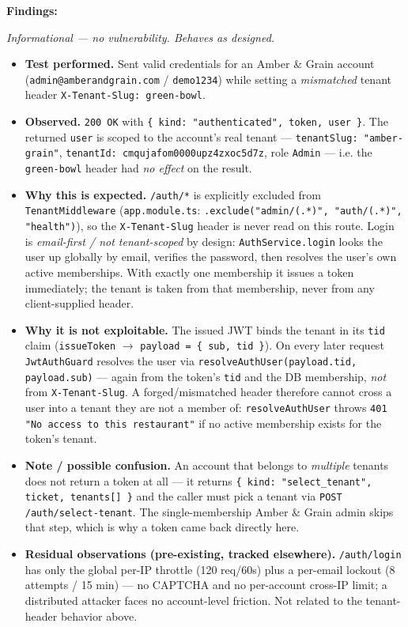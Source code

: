 \documentclass[11pt,a4paper]{article}
\newcommand{\code}[1]{\colorbox{codebg}{\texttt{\small #1}}}
\begin{document}
\textbf{Findings:}

\textit{\textcolor{muted}{Informational — no vulnerability. Behaves as designed.}}

\begin{itemize}[leftmargin=1.4em,itemsep=2pt,topsep=2pt]
  \item \textbf{Test performed.} Sent valid credentials for an Amber \& Grain
        account (\code{admin@amberandgrain.com} / \code{demo1234}) while setting a
        \emph{mismatched} tenant header \code{X-Tenant-Slug: green-bowl}.
  \item \textbf{Observed.} \code{200 OK} with
        \code{\{ kind: "authenticated", token, user \}}. The returned \code{user}
        is scoped to the account's real tenant — \code{tenantSlug: "amber-grain"},
        \code{tenantId: cmqujafom0000upz4zxoc5d7z}, role \code{Admin} — i.e. the
        \code{green-bowl} header had \emph{no effect} on the result.
  \item \textbf{Why this is expected.} \code{/auth/*} is explicitly excluded from
        \code{TenantMiddleware} (\code{app.module.ts}:
        \code{.exclude("admin/(.*)", "auth/(.*)", "health")}), so the
        \code{X-Tenant-Slug} header is never read on this route. Login is
        \emph{email-first / not tenant-scoped} by design: \code{AuthService.login}
        looks the user up globally by email, verifies the password, then resolves
        the user's own active memberships. With exactly one membership it issues a
        token immediately; the tenant is taken from that membership, never from any
        client-supplied header.
  \item \textbf{Why it is not exploitable.} The issued JWT binds the tenant in its
        \code{tid} claim (\code{issueToken} $\to$ \code{payload = \{ sub, tid \}}).
        On every later request \code{JwtAuthGuard} resolves the user via
        \code{resolveAuthUser(payload.tid, payload.sub)} — again from the token's
        \code{tid} and the DB membership, \emph{not} from \code{X-Tenant-Slug}. A
        forged/mismatched header therefore cannot cross a user into a tenant they
        are not a member of: \code{resolveAuthUser} throws \code{401 "No access to
        this restaurant"} if no active membership exists for the token's tenant.
  \item \textbf{Note / possible confusion.} An account that belongs to
        \emph{multiple} tenants does not return a token at all — it returns
        \code{\{ kind: "select\_tenant", ticket, tenants[] \}} and the caller must
        pick a tenant via \code{POST /auth/select-tenant}. The single-membership
        Amber \& Grain admin skips that step, which is why a token came back
        directly here.
  \item \textbf{Residual observations (pre-existing, tracked elsewhere).}
        \code{/auth/login} has only the global per-IP throttle (120 req/60s) plus a
        per-email lockout (8 attempts / 15 min) — no CAPTCHA and no per-account
        cross-IP limit; a distributed attacker faces no account-level friction.
        Not related to the tenant-header behavior above.
\end{itemize}
\end{document}
